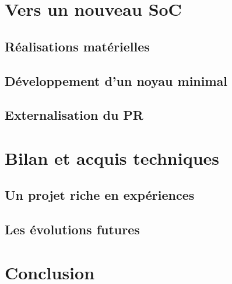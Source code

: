 \documentclass[a4paper]{report}
\begin{document}
\newpage


\chapter{Vers un nouveau SoC}

\section{Réalisations matérielles}


\section{Développement d'un noyau minimal}


\section{Externalisation du PR}


\newpage



\chapter{Bilan et acquis techniques}

\section{Un projet riche en expériences}


\section{Les évolutions futures}



\newpage

\chapter*{Conclusion} 

 
\newpage
\end{document}
